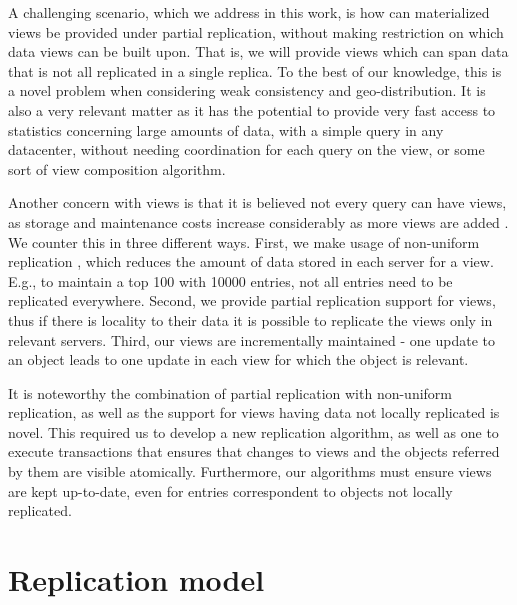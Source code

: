 A challenging scenario, which we address in this work, is how can materialized views be provided under partial replication, without making restriction on which data views can be built upon.
That is, we will provide views which can span data that is not all replicated in a single replica.
To the best of our knowledge, this is a novel problem when considering weak consistency and geo-distribution.
It is also a very relevant matter as it has the potential to provide very fast access to statistics concerning large amounts of data, with a simple query in any datacenter, without needing coordination for each query on the view, or some sort of view composition algorithm.

Another concern with views is that it is believed not every query can have views, as storage and maintenance costs increase considerably as more views are added \cite{???}.
We counter this in three different ways.
First, we make usage of non-uniform replication \cite{???}, which reduces the amount of data stored in each server for a view.
E.g., to maintain a top 100 with 10000 entries, not all entries need to be replicated everywhere.
Second, we provide partial replication support for views, thus if there is locality to their data it is possible to replicate the views only in relevant servers.
Third, our views are incrementally maintained - one update to an object leads to one update in each view for which the object is relevant.

It is noteworthy the combination of partial replication with non-uniform replication, as well as the support for views having data not locally replicated is novel.
This required us to develop a new replication algorithm, as well as one to execute transactions that ensures that changes to views and the objects referred by them are visible atomically.
Furthermore, our algorithms must ensure views are kept up-to-date, even for entries correspondent to objects not locally replicated.


\section{Replication model}
\label{sec:replication_model}

